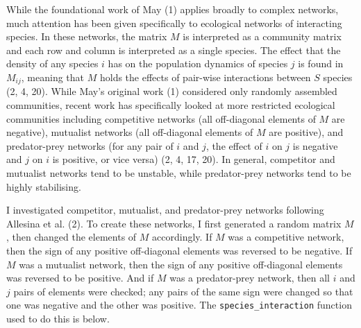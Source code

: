 \documentclass[]{article}
\begin{document}
While the foundational work of May (1) applies broadly to complex
networks, much attention has been given specifically to ecological
networks of interacting species. In these networks, the matrix \(M\) is
interpreted as a community matrix and each row and column is interpreted
as a single species. The effect that the density of any species \(i\)
has on the population dynamics of species \(j\) is found in \(M_{ij}\),
meaning that \(M\) holds the effects of pair-wise interactions between
\(S\) species (2, 4, 20). While May's original work (1) considered only
randomly assembled communities, recent work has specifically looked at
more restricted ecological communities including competitive networks
(all off-diagonal elements of \(M\) are negative), mutualist networks
(all off-diagonal elements of \(M\) are positive), and predator-prey
networks (for any pair of \(i\) and \(j\), the effect of \(i\) on \(j\)
is negative and \(j\) on \(i\) is positive, or vice versa) (2, 4, 17,
20). In general, competitor and mutualist networks tend to be unstable,
while predator-prey networks tend to be highly stabilising.

I investigated competitor, mutualist, and predator-prey networks
following Allesina et al. (2). To create these networks, I first
generated a random matrix \(M\), then changed the elements of \(M\)
accordingly. If \(M\) was a competitive network, then the sign of any
positive off-diagonal elements was reversed to be negative. If \(M\) was
a mutualist network, then the sign of any positive off-diagonal elements
was reversed to be positive. And if \(M\) was a predator-prey network,
then all \(i\) and \(j\) pairs of elements were checked; any pairs of
the same sign were changed so that one was negative and the other was
positive. The \texttt{species\_interaction} function used to do this is
below.
\end{document}
